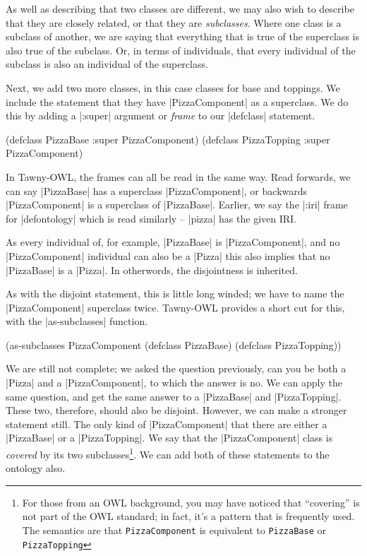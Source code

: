 As well as describing that two classes are different, we may also wish
to describe that they are closely related, or that they are
\emph{subclasses}. Where one class is a subclass of another, we are saying
that everything that is true of the superclass is also true of the
subclass. Or, in terms of individuals, that every individual of the
subclass is also an individual of the superclass.

Next, we add two more classes, in this case classes for base and
toppings. We include the statement that they have |PizzaComponent| as
a superclass. We do this by adding a |:super| argument or \emph{frame}
to our |defclass| statement.

\begin{tawnyexample}
(defclass PizzaBase
  :super PizzaComponent)
(defclass PizzaTopping
  :super PizzaComponent)
\end{tawnyexample}

In Tawny-OWL, the frames can all be read in the same way. Read
forwards, we can say |PizzaBase| has a superclass |PizzaComponent|, or
backwards |PizzaComponent| is a superclass of |PizzaBase|. Earlier, we
say the |:iri| frame for |defontology| which is read similarly --
|pizza| has the given IRI.

As every individual of, for example, |PizzaBase| is |PizzaComponent|, and no
|PizzaComponent| individual can also be a |Pizza| this also implies that no
|PizzaBase| is a |Pizza|. In otherwords, the disjointness is inherited.

As with the disjoint statement, this is little long winded; we have to name
the |PizzaComponent| superclass twice. Tawny-OWL provides a short cut for
this, with the |as-subclasses| function.

\begin{tawnyexample}
(as-subclasses
 PizzaComponent
 (defclass PizzaBase)
 (defclass PizzaTopping))
\end{tawnyexample}

We are still not complete; we asked the question previously, can you
be both a |Pizza| and a |PizzaComponent|, to which the answer is
no. We can apply the same question, and get the same answer to a
|PizzaBase| and |PizzaTopping|.  These two, therefore, should also be
disjoint. However, we can make a stronger statement still. The only
kind of |PizzaComponent| that there are either a |PizzaBase| or a
|PizzaTopping|. We say that the |PizzaComponent| class is
\emph{covered} by its two subclasses\footnote{For those from an OWL
  background, you may have noticed that ``covering'' is not part of
  the OWL standard; in fact, it's a pattern that is frequently
  used. The semantics are that \lstinline{PizzaComponent} is
  equivalent to \lstinline{PizzaBase} or \lstinline{PizzaTopping}}. We
can add both of these statements to the ontology also.

